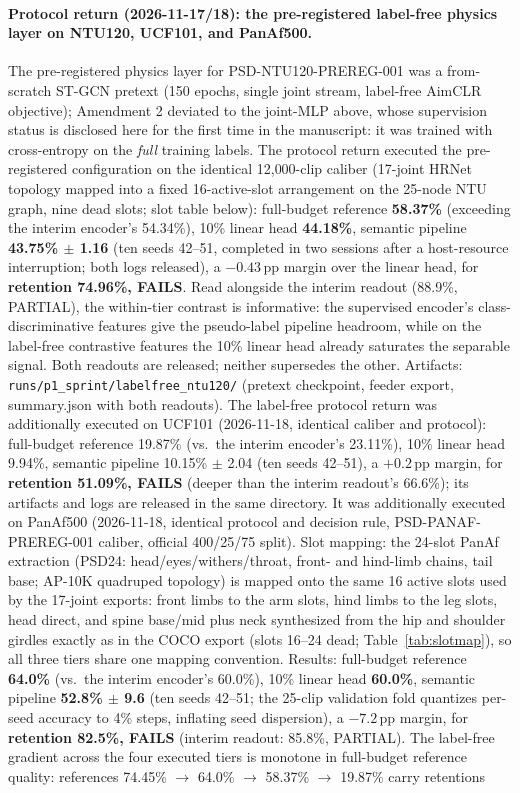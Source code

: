 \documentclass[11pt,a4paper]{article}
\begin{document}
\paragraph{Protocol return (2026-11-17/18): the pre-registered label-free physics layer on NTU120, UCF101, and PanAf500.}
The pre-registered physics layer for PSD-NTU120-PREREG-001 was a from-scratch ST-GCN pretext (150 epochs, single joint stream, label-free AimCLR objective); Amendment 2 deviated to the joint-MLP above, whose supervision status is disclosed here for the first time in the manuscript: it was trained with cross-entropy on the \emph{full} training labels. The protocol return executed the pre-registered configuration on the identical 12{,}000-clip caliber (17-joint HRNet topology mapped into a fixed 16-active-slot arrangement on the 25-node NTU graph, nine dead slots; slot table below): full-budget reference \textbf{58.37\%} (exceeding the interim encoder's 54.34\%), 10\% linear head \textbf{44.18\%}, semantic pipeline \textbf{43.75\% $\pm$ 1.16} (ten seeds 42--51, completed in two sessions after a host-resource interruption; both logs released), a $-0.43$\,pp margin over the linear head, for \textbf{retention 74.96\%, FAILS}. Read alongside the interim readout (88.9\%, PARTIAL), the within-tier contrast is informative: the supervised encoder's class-discriminative features give the pseudo-label pipeline headroom, while on the label-free contrastive features the 10\% linear head already saturates the separable signal. Both readouts are released; neither supersedes the other. Artifacts: \texttt{runs/p1\_sprint/labelfree\_ntu120/} (pretext checkpoint, feeder export, summary.json with both readouts). The label-free protocol return was additionally executed on UCF101 (2026-11-18, identical caliber and protocol): full-budget reference 19.87\% (vs.\ the interim encoder's 23.11\%), 10\% linear head 9.94\%, semantic pipeline 10.15\% $\pm$ 2.04 (ten seeds 42--51), a $+0.2$\,pp margin, for \textbf{retention 51.09\%, FAILS} (deeper than the interim readout's 66.6\%); its artifacts and logs are released in the same directory. It was additionally executed on PanAf500 (2026-11-18, identical protocol and decision rule, PSD-PANAF-PREREG-001 caliber, official 400/25/75 split). Slot mapping: the 24-slot PanAf extraction (PSD24: head/eyes/withers/throat, front- and hind-limb chains, tail base; AP-10K quadruped topology) is mapped onto the same 16 active slots used by the 17-joint exports: front limbs to the arm slots, hind limbs to the leg slots, head direct, and spine base/mid plus neck synthesized from the hip and shoulder girdles exactly as in the COCO export (slots 16--24 dead; Table~\ref{tab:slotmap}), so all three tiers share one mapping convention. Results: full-budget reference \textbf{64.0\%} (vs.\ the interim encoder's 60.0\%), 10\% linear head \textbf{60.0\%}, semantic pipeline \textbf{52.8\% $\pm$ 9.6} (ten seeds 42--51; the 25-clip validation fold quantizes per-seed accuracy to 4\% steps, inflating seed dispersion), a $-7.2$\,pp margin, for \textbf{retention 82.5\%, FAILS} (interim readout: 85.8\%, PARTIAL). The label-free gradient across the four executed tiers is monotone in full-budget reference quality: references 74.45\% $\to$ 64.0\% $\to$ 58.37\% $\to$ 19.87\% carry retentions 
\end{document}
